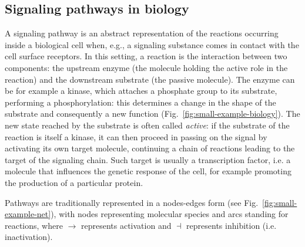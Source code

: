 \documentclass{llncs}
\begin{document}
\subsection{Signaling pathways in biology}\label{sec:biologia}
A signaling pathway is an abstract representation of the reactions occurring inside a biological cell when, e.g., a
signaling substance comes in contact with the cell surface receptors.
In this setting, a reaction is the interaction between
two components: the upstream enzyme (the molecule holding the active role in the reaction) and the downstream
substrate (the passive molecule). The enzyme can be for example a kinase, which attaches a phosphate group to its
substrate, performing a phosphorylation: this determines a change in the shape of the substrate
and consequently a new function (Fig.~\ref{fig:small-example-biology}).
The new state reached by the substrate
is often called \emph{active}: if the substrate of the reaction is itself a kinase, it can then proceed in passing
on the signal by activating its own target molecule, continuing a chain of reactions leading to the target
of the signaling chain. Such target is usually a transcription factor, i.e. a molecule that influences
the genetic response of the cell, for example promoting the production of a particular protein.

Pathways are traditionally represented in a nodes-edges form (see Fig.~\ref{fig:small-example-net}),
with nodes representing molecular species and arcs standing for reactions, where $\rightarrow$ represents
activation and $\dashv$ represents inhibition (i.e. inactivation). 

\def\scalaRete{0.16}
\end{document}
